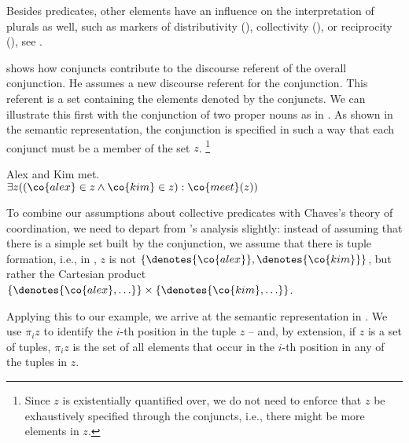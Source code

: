 \documentclass[output=paper]{langsci/langscibook}
\begin{document}

Besides predicates, other elements have an influence on the interpretation of plurals as well,
such as markers of distributivity (), collectivity (), or reciprocity (), see \citet{Sternefeld:98}.

\citet{Chaves:07} shows how conjuncts contribute to the discourse referent of the overall conjunction. 
He assumes a new discourse referent for the conjunction. This referent is a set containing the elements denoted by the conjuncts.
We can illustrate this first with the conjunction of two proper nouns as in .
As shown in the semantic representation, the conjunction is specified in such a way that each conjunct must be a member of the set $z$.%
\footnote{Since $z$ is existentially quantified over, we do not need to enforce that $z$ be exhaustively specified through the conjuncts, i.e., there might be more elements in $z$.}

\ea \label{AlexKimTalk}
Alex and Kim met.\\
 $\exists z 
((\co{alex} \in z
\land \co{kim} \in z)
: \co{meet}(z))$
\z

To combine our assumptions about collective predicates with Chaves's theory of coordination, 
we need to depart from \citeauthor{Chaves:07}'s analysis slightly: instead of assuming that there is a simple set built by the conjunction, we assume that there is tuple formation, i.e., in , $z$ is not  $\{\denotes{\co{alex}}, \denotes{\co{kim}}\}$,
but rather the Cartesian product
$\{ \denotes{\co{alex}, \ldots} \} \times \{\denotes{\co{kim}, \ldots} \}$.%

Applying this to our example, we arrive at the semantic representation in . 
We use $\pi_i z$ to identify the $i$-th position in the tuple $z$ -- and, by extension, if $z$ is a set of tuples, $\pi_i z$ is the set of all elements that occur in the $i$-th position in any of the tuples in $z$.

\end{document}
